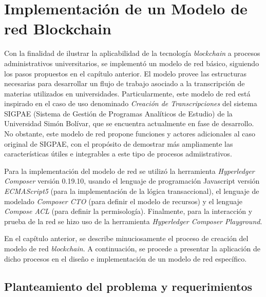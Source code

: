  \graphicspath{ {Figs/Chapter4/} }
 
 \chapter{Implementación de un Modelo de red Blockchain}
 
 Con la finalidad de ilustrar la aplicabilidad de la tecnología {\it blockchain} a procesos administrativos universitarios, 
 se implementó un modelo de red básico, siguiendo los pasos propuestos en el capítulo anterior. El modelo provee las estructuras necesarias para desarrollar un flujo de trabajo asociado a la transcripción de materias utilizados en universidades. Particularmente, este modelo de red está inspirado en el caso de uso denominado \textit{Creación de Transcripciones} del sistema SIGPAE (Sistema de Gestión de Programas Analíticos de Estudio) de la Universidad Simón Bolívar, que se encuentra actualmente en fase de desarrollo. No obstante, este modelo de red propone funciones y actores adicionales al caso original de SIGPAE, con el propósito de demostrar más ampliamente las características útiles e integrables a este tipo de procesos admiistrativos.
 
 
Para la  implementación del modelo de red se utilizó la herramienta \textit{Hyperledger Composer} versión 0.19.10, usando el lenguaje de programación Javascript versión \textit{ECMAScript5} (para la implementación de la lógica transaccional), el lenguaje de modelado  \textit{Composer CTO} (para definir el modelo de recursos) y el lenguaje  \textit{Compose ACL} (para definir la permisología). Finalmente, para la interacción y prueba de la red se hizo uso de la herramienta \textit{Hyperledger Composer Playground}. 
 
En el capítulo anterior, se describe minuciosamente el proceso de creación del modelo de red \textit{blockchain}. A continuación, se procede a presentar la aplicación de dicho procesos en el diseño e implementación de un modelo de red específico.

\section{Planteamiento del problema y requerimientos}

